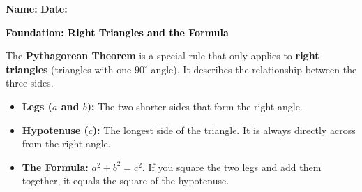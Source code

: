 \documentclass[12pt, letterpaper, fleqn]{article}
\begin{document}
\textbf{Name:} \underline{\hspace{5cm}}
\hfill
\textbf{Date:} \underline{\hspace{3cm}}\\

\begin{tcolorbox}[colback=customteal!20]
    \large\textcolor{black}{\textbf{Foundation: Right Triangles and the Formula}}
\end{tcolorbox}

\vspace{3mm}

\noindent
The \textbf{Pythagorean Theorem} is a special rule that only applies to \textbf{right triangles} (triangles with one $90^\circ$ angle). It describes the relationship between the three sides.

\begin{itemize}
    \item \textbf{Legs ($a$ and $b$):} The two shorter sides that form the right angle.
    \item \textbf{Hypotenuse ($c$):} The longest side of the triangle. It is always directly across from the right angle.
    \item \textbf{The Formula:} $a^2 + b^2 = c^2$. If you square the two legs and add them together, it equals the square of the hypotenuse.
\end{itemize}

\vspace{4mm}
\end{document}
